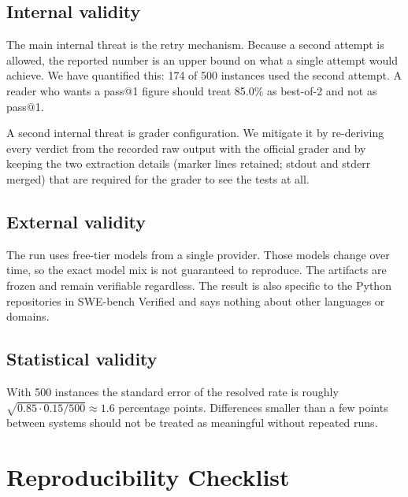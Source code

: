 \documentclass[11pt,a4paper]{article}
\begin{document}
\subsection{Internal validity}

The main internal threat is the retry mechanism. Because a second attempt is allowed,
the reported number is an upper bound on what a single attempt would achieve. We have
quantified this: 174 of 500 instances used the second attempt. A reader who wants a
pass@1 figure should treat 85.0\% as best-of-2 and not as pass@1.

A second internal threat is grader configuration. We mitigate it by re-deriving every
verdict from the recorded raw output with the official grader and by keeping the two
extraction details (marker lines retained; stdout and stderr merged) that are required
for the grader to see the tests at all.

\subsection{External validity}

The run uses free-tier models from a single provider. Those models change over time, so
the exact model mix is not guaranteed to reproduce. The artifacts are frozen and remain
verifiable regardless. The result is also specific to the Python repositories in
SWE-bench Verified and says nothing about other languages or domains.

\subsection{Statistical validity}

With 500 instances the standard error of the resolved rate is roughly
$\sqrt{0.85 \cdot 0.15 / 500} \approx 1.6$ percentage points. Differences smaller than a
few points between systems should not be treated as meaningful without repeated runs.

\section{Reproducibility Checklist}
\label{sec:repro-checklist}
\end{document}
